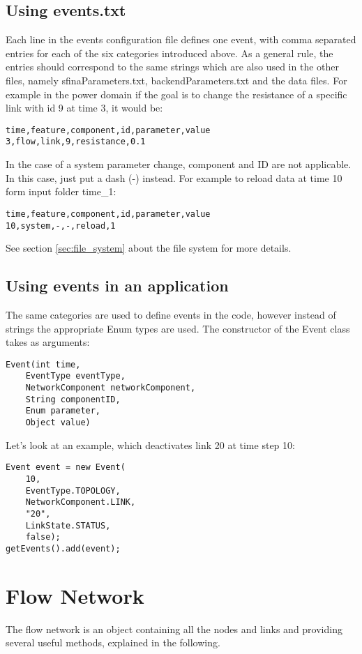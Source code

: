 \documentclass[11pt,fleqn]{book} %
\newcommand{\domain}[1][]{domain#1}
\newcommand{\backendParametersFile}{backendParameters.txt}
\newcommand{\sfinaParametersFile}{sfinaParameters.txt}
\begin{document}
\subsection{Using events.txt}
Each line in the events configuration file defines one event, with comma separated entries for each of the six categories introduced above. As a general rule, the entries should correspond to the same strings which are also used in the other files, namely \sfinaParametersFile{}, \backendParametersFile{} and the data files. For example in the power \domain{} if the goal is to change the resistance of a specific link with id 9 at time 3, it would be:
\begin{lstlisting}
time,feature,component,id,parameter,value
3,flow,link,9,resistance,0.1
\end{lstlisting}
In the case of a system parameter change, component and ID are not applicable. In this case, just put a dash (-) instead. For example to reload data at time 10 form input folder time\_1:
\begin{lstlisting}
time,feature,component,id,parameter,value
10,system,-,-,reload,1
\end{lstlisting}
See section \ref{sec:file_system} about the file system for more details.

\subsection{Using events in an application}
The same categories are used to define events in the code, however instead of strings the appropriate Enum types are used. The constructor of the Event class takes as arguments:
\begin{lstlisting}
Event(int time, 
	EventType eventType, 
	NetworkComponent networkComponent, 
	String componentID, 
	Enum parameter, 
	Object value)
\end{lstlisting}
Let’s look at an example, which deactivates link 20 at time step 10:
\begin{lstlisting}
Event event = new Event(
	10,
	EventType.TOPOLOGY,
	NetworkComponent.LINK,
	"20",
	LinkState.STATUS,
	false);
getEvents().add(event);
\end{lstlisting}

\section{Flow Network}\label{sec:flow_net}
The flow network is an object containing all the nodes and links and providing several useful methods, explained in the following. 
\end{document}
